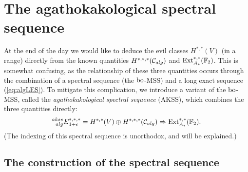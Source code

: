 


\section{The agathokakological spectral sequence}\label{sec:rules}

At the end of the day we would like to deduce the evil classes $H^{*,*}(V)$ (in a range) directly from the known quantities $H^{*,*,*}(\mathcal{C}_{alg})$ and $\operatorname{Ext}^{*,*}_{A_*}(\mathbb{F}_2)$.  This is somewhat confusing, as the relationship of these three quantities occurs through the combination of a spectral sequence (the $\mathrm{bo}$-MSS) and a long exact sequence (\ref{eq:algLES}). To mitigate this complication, we introduce a variant of the $\mathrm{bo}$-MSS, called the \emph{agathokakological spectral sequence} (AKSS), which combines the three quantities directly:
$$ \prescript{akss}{alg}{E}_{1+\epsilon}^{*,*,*} = H^{*,*}(V) \oplus H^{*,*,*}(\mathcal{C}_{alg})\Rightarrow \operatorname{Ext}_{A_*}^{*,*}(\mathbb{F}_2). $$
(The indexing of this spectral sequence is unorthodox, and will be explained.)

\subsection*{The construction of the spectral sequence}

